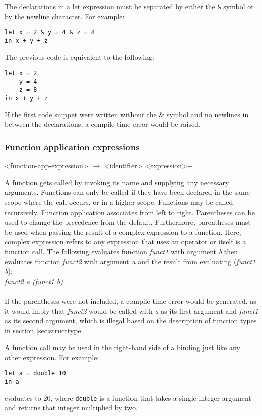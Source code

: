 The declarations in a let expression must be separated by either the \texttt{\&} symbol or by the newline character. For example:

\begin{verbatim}
let x = 2 & y = 4 & z = 8 
in x + y + z
\end{verbatim}

The previous code is equivalent to the following:

\begin{verbatim}
let x = 2
    y = 4
    z = 8
in x + y + z
\end{verbatim}

If the first code snippet were written without the \& symbol and no newlines in between the
declarations, a compile-time error would be raised.

\subsubsection{Function application expressions}

\begin{grammar}
<function-app-expression> $\rightarrow$ <identifier> <expression>+
\end{grammar}

A function gets called by invoking its name and supplying any necessary arguments. 
Functions can only be called if they have been declared in the same scope where the call occurs,
or in a higher scope. Functions may be called recursively. Function application associates 
from left to right. Parentheses can be used to change the precedence from the default. Furthermore,
parentheses must be used when passing the result of a complex expression to a function. Here, complex expression
refers to any expression that uses an operator or itself is a function call.
The following evaluates function \emph{funct1} with argument \emph{b} then evaluates function
\emph{funct2} with argument \emph{a} and the result from evaluating (\emph{funct1 b}): \\
    
    \emph{funct2 a (funct1 b)}\\ \\
If the parentheses were not included, a compile-time error would be generated, as it would imply
that \emph{funct2} would be called with \emph{a} as
its first argument and \emph{funct1} as its second argument, which is illegal based on the description
of function types in section \ref{sec:structtype}.

A function call may be used in the right-hand side of a binding just like any other expression. 
For example:
\begin{verbatim}
let a = double 10 
in a
\end{verbatim}
evaluates to 20, where \texttt{double} is a function that takes a single integer argument and
returns that integer multiplied by two. 

